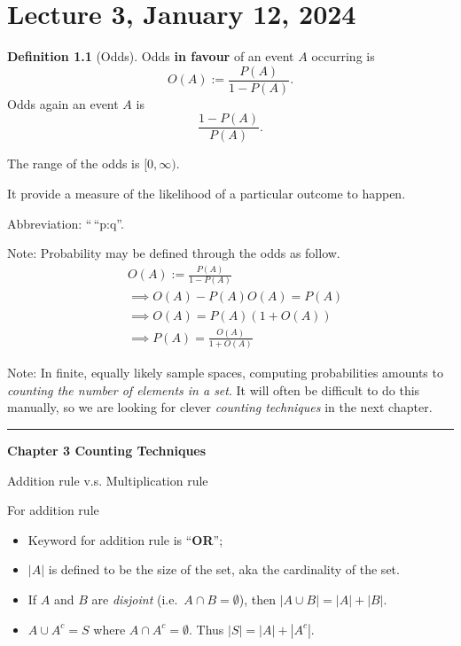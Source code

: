 \documentclass[
]{book}
\providecommand{\tightlist}{%
  \setlength{\itemsep}{0pt}\setlength{\parskip}{0pt}}
\theoremstyle{definition}
\newtheorem{definition}{Definition}[chapter]
\theoremstyle{definition}
\theoremstyle{definition}
\theoremstyle{definition}
\theoremstyle{remark}
\begin{document}
\chapter{Lecture 3, January 12, 2024}\label{lecture-3-january-12-2024}

\begin{definition}[Odds]
Odds \textbf{in favour} of an event \(A\) occurring is
\[
  O(A) := \frac{P(A)}{1-P(A)}.
\]
Odds again an event \(A\) is
\[
  \frac{1-P(A)}{P(A)}.
\]
\end{definition}

The range of the odds is \([0,\infty)\).

It provide a measure of the likelihood of a particular outcome to happen.

Abbreviation: ``\,``p:q''.

Note: Probability may be defined through the odds as follow.
\begin{align*}
  &O(A) := \frac{P(A)}{1-P(A)} \\
  &\implies O(A) - P(A)O(A) = P(A) \\
  &\implies O(A) = P(A) (1+O(A)) \\
  &\implies P(A) = \frac{O(A)} {1+O(A)}
\end{align*}

Note: In finite, equally likely sample spaces, computing probabilities amounts to \emph{counting the number of elements in a set}. It will often be difficult to do this manually, so we are looking for clever \emph{counting techniques} in the next chapter.

\begin{center}\rule{0.5\linewidth}{0.5pt}\end{center}

\textbf{Chapter 3 Counting Techniques}

Addition rule v.s. Multiplication rule

For addition rule

\begin{itemize}
\tightlist
\item
  Keyword for addition rule is ``\textbf{OR}'';
\item
  \(|A|\) is defined to be the size of the set, aka the cardinality of the set.
\item
  If \(A\) and \(B\) are \emph{disjoint} (i.e.~\(A\cap B = \emptyset\)), then \(|A\cup B| = |A| + |B|\).
\item
  \(A\cup A^c = S\) where \(A \cap A^c = \emptyset\). Thus \(|S|=|A|+|A^c|\).
\end{itemize}
\end{document}

